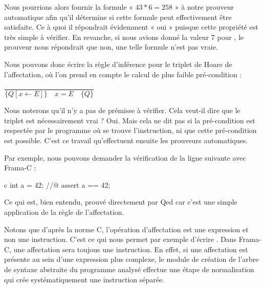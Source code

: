 \documentclass[middle]{zmdocument}
\begin{document}
Nous pourrions alors fournir la formule « $43*6 = 258$ » à notre prouveur automatique
afin qu'il détermine si cette formule peut effectivement être satisfaite. Ce à quoi
il répondrait évidemment « oui » puisque cette propriété est très simple à vérifier.
En revanche, si nous avions donné la valeur 7 pour , le prouveur nous répondrait
que non, une telle formule n'est pas vraie.



Nous pouvons donc écrire la règle d'inférence pour le triplet de Hoare de 
l'affectation, où l'on prend en compte le calcul de plus faible pré-condition :




\begin{center}
$\dfrac{}{\{Q[x \leftarrow E] \}\quad x = E \quad\{ Q \}}$


\end{center}


Nous noterons qu'il n'y a pas de prémisse à vérifier. Cela veut-il dire que le
triplet est nécessairement vrai ? Oui. Mais cela ne dit pas si la pré-condition 
est respectée par le programme où se trouve l'instruction, ni que cette 
pré-condition est possible. C'est ce travail qu'effectuent ensuite les prouveurs
automatiques.



Par exemple, nous pouvons demander la vérification de la ligne suivante avec 
Frama-C :



\begin{CodeBlock}{c}
int a = 42;
//@ assert a == 42;
\end{CodeBlock}



Ce qui est, bien entendu, prouvé directement par Qed car c'est une simple 
application de la règle de l'affectation.



\begin{Information}
Notons que d'après la norme C, l'opération d'affectation est une expression
et non une instruction. C'est ce qui nous permet par exemple d'écrire 
. Dans Frama-C, une affectation sera toujous une
instruction. En effet, si une affectation est présente au sein d'une 
expression plus complexe, le module de création de l'arbre de syntaxe abstraite
du programme analysé effectue une étape de normalisation qui crée 
systématiquement une instruction séparée.
\end{Information}
\end{document}
